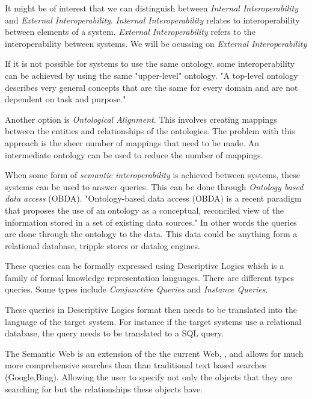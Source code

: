 \documentclass[12pt,a4paper]{article}
\begin{document}
It might be of interest that we can distinguish between \emph{Internal Interoperability} and \emph{External Interoperability}. \emph{Internal Interoperability} relates to interoperability between elements of a system. \emph{External Interoperability} refers to the interoperability between systems. \citep{Garcia2011} We will be ocussing on \emph{External Interoperability}

If it is not possible for systems to use the same ontology, some interoperability can be achieved by using the same "upper-level" ontology. "A top-level ontology describes very general concepts that are the same for every domain and are not dependent on task and purpose." \citep{VanDiggelen2007} 

Another option is \emph{Ontological Alignment}. This involves creating mappings between the entities and relationships of the ontologies. The problem with this approach is the sheer number of mappings that need to be made. \citep{VanDiggelen2007} An intermediate ontology can be used to reduce the number of mappings.\citep{Ciocoiu2000,VanDiggelen2007}

When some form of \emph{semantic interoperability} is achieved between systems, these systems can be used to answer queries.  This can be done through \emph{Ontology based data access} (OBDA). "Ontology-based data access (OBDA) is a recent paradigm that proposes the use of an ontology as a conceptual, reconciled view of the information stored in a set of existing data sources." \citep{Bien2015} In other words the queries are done through the ontology to the data. This data could be anything form a relational database, tripple stores or datalog engines.\citep{RodMuro2013}

These queries can be formally expressed using Descriptive Logics which is a family of formal knowledge representation languages. There are different types queries. Some types include \emph{Conjunctive Queries} and \emph{Instance Queries}. \cite{Bien2015}
 
These queries in Descriptive Logics format then needs to be translated into the language of the target system. For instance if the target systems use a relational database, the query needs to be translated to a SQL query. \citep{kon2013}

The Semantic Web is an extension of the the current Web, \cite{lee2001}, and allows for much more comprehensive searches than than traditional text based searches (Google,Bing). Allowing the user to specify not only the objects that they are searching for but the relationships these objects have.


\end{document}
